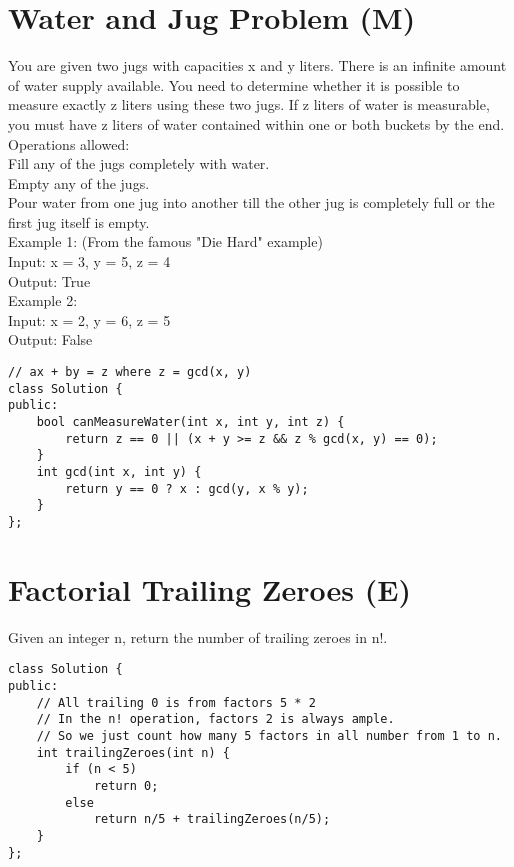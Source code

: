 \section{Water and Jug Problem (M)}
You are given two jugs with capacities x and y liters. There is an infinite amount of water supply available. You need to determine whether it is possible to measure exactly z liters using these two jugs. If z liters of water is measurable, you must have z liters of water contained within one or both buckets by the end.\\

Operations allowed:\\
    Fill any of the jugs completely with water.\\
    Empty any of the jugs.\\
    Pour water from one jug into another till the other jug is completely full or the first jug itself is empty.\\

Example 1: (From the famous "Die Hard" example)\\
Input: x = 3, y = 5, z = 4\\
Output: True\\

Example 2:\\
Input: x = 2, y = 6, z = 5\\
Output: False\\

\begin{lstlisting}
// ax + by = z where z = gcd(x, y)
class Solution {
public:
    bool canMeasureWater(int x, int y, int z) {
        return z == 0 || (x + y >= z && z % gcd(x, y) == 0);
    }
    int gcd(int x, int y) {
        return y == 0 ? x : gcd(y, x % y);
    }
};
\end{lstlisting}


\section{Factorial Trailing Zeroes (E)}
Given an integer n, return the number of trailing zeroes in n!.\\

\begin{lstlisting}
class Solution {
public:
    // All trailing 0 is from factors 5 * 2
    // In the n! operation, factors 2 is always ample. 
    // So we just count how many 5 factors in all number from 1 to n.
    int trailingZeroes(int n) {
        if (n < 5)
            return 0;
        else
            return n/5 + trailingZeroes(n/5);
    }
};
\end{lstlisting}


